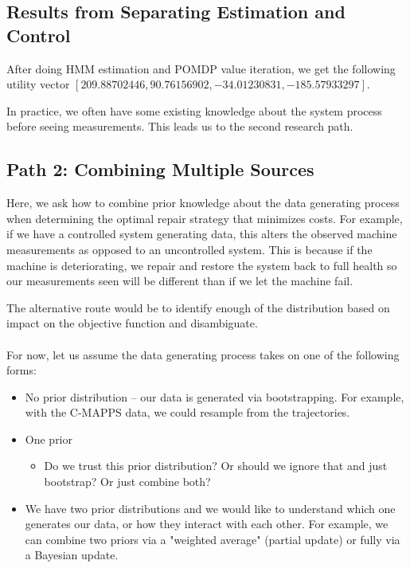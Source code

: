 \documentclass[english]{article}
\numberwithin{equation}{section}
\begin{document}
	\subsection*{Results from Separating Estimation and Control}
	After doing HMM estimation and POMDP value iteration, we get the following utility vector $[209.88702446,   90.76156902,  -34.01230831, -185.57933297]$.
	
	In practice, we often have some existing knowledge about the system process before seeing measurements. This leads us to the second research path.
	
	\subsection*{Path 2: Combining Multiple Sources}
	
	Here, we ask how to combine prior knowledge about the data generating process when determining the optimal repair strategy that minimizes costs. For example, if we have a controlled system generating data, this alters the observed machine measurements as opposed to an uncontrolled system. This is because if the machine is deteriorating, we repair and restore the system back to full health so our measurements seen will be different than if we let the machine fail.
	
	The alternative route would be to identify enough of the distribution based on impact on the objective function and disambiguate. 
	\\
	\\
	For now, let us assume the data generating process takes on one of the following forms:
	\begin{itemize}
		\item No prior distribution -- our data is generated via bootstrapping. For example, with the C-MAPPS data, we could resample from the trajectories.
		\item One prior
		\begin{itemize}
			\item Do we trust this prior distribution? Or should we ignore that and just bootstrap? Or just combine both?
		\end{itemize}
		\item We have two prior distributions and we would like to understand which one generates our data, or how they interact with each other. For example, we can combine two priors via a "weighted average" (partial update) or fully via a Bayesian update.
	\end{itemize}
	
\end{document}
